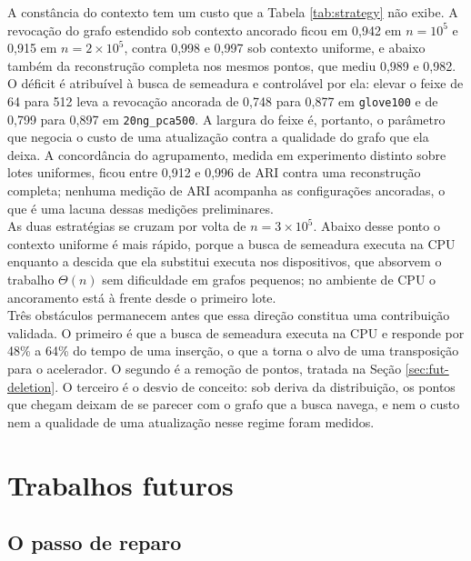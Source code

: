 A constância do contexto tem um custo que a Tabela \ref{tab:strategy} não exibe. A revocação do grafo estendido sob contexto ancorado ficou em 0,942 em $n = 10^5$ e 0,915 em $n = 2 \times 10^5$, contra 0,998 e 0,997 sob contexto uniforme, e abaixo também da reconstrução completa nos mesmos pontos, que mediu 0,989 e 0,982. O déficit é atribuível à busca de semeadura e controlável por ela: elevar o feixe de 64 para 512 leva a revocação ancorada de 0,748 para 0,877 em \texttt{glove100} e de 0,799 para 0,897 em \texttt{20ng\_pca500}. A largura do feixe é, portanto, o parâmetro que negocia o custo de uma atualização contra a qualidade do grafo que ela deixa. A concordância do agrupamento, medida em experimento distinto sobre lotes uniformes, ficou entre 0,912 e 0,996 de \ac{ARI} contra uma reconstrução completa; nenhuma medição de \ac{ARI} acompanha as configurações ancoradas, o que é uma lacuna dessas medições preliminares.\\

As duas estratégias se cruzam por volta de $n = 3 \times 10^5$. Abaixo desse ponto o contexto uniforme é mais rápido, porque a busca de semeadura executa na \ac{CPU} enquanto a descida que ela substitui executa nos dispositivos, que absorvem o trabalho $\Theta(n)$ sem dificuldade em grafos pequenos; no ambiente de \ac{CPU} o ancoramento está à frente desde o primeiro lote.\\

Três obstáculos permanecem antes que essa direção constitua uma contribuição validada. O primeiro é que a busca de semeadura executa na \ac{CPU} e responde por 48\% a 64\% do tempo de uma inserção, o que a torna o alvo de uma transposição para o acelerador. O segundo é a remoção de pontos, tratada na Seção \ref{sec:fut-deletion}. O terceiro é o desvio de conceito: sob deriva da distribuição, os pontos que chegam deixam de se parecer com o grafo que a busca navega, e nem o custo nem a qualidade de uma atualização nesse regime foram medidos.\\

\section{Trabalhos futuros\label{sec:disc-future}}

\subsection{O passo de reparo\label{sec:fut-repair}}

